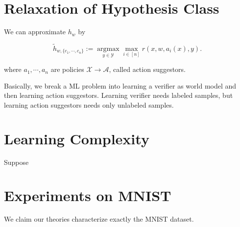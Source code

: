 \documentclass[11pt, oneside]{article}   	%
\theoremstyle{definition}
\begin{document}
\section{Relaxation of Hypothesis Class}

We can approximate $h_w$ by

\begin{equation}
	\tilde h_{w,\{c_1,\cdots,c_n\}}:=\mathop{\text{argmax}}\limits_{y\in \mathcal{Y}}\max_{i\in [n]} r(x, w, a_i(x), y).
\end{equation}

where $a_1,\cdots,a_n$ are policies $\mathcal{X}\to \mathcal{A}$, called action suggestors.

Basically, we break a ML problem into learning a verifier as world model and then learning action suggestors. Learning verifier needs labeled samples, but learning action suggestors needs only unlabeled samples.

\section{Learning Complexity}

Suppose

\section{Experiments on MNIST}


 We claim our theories characterize exactly the MNIST dataset.
\end{document}
